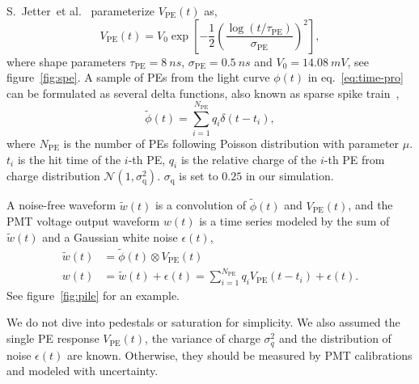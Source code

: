 S.~Jetter~et al.~\cite{jetter_pmt_2012} parameterize $V_\mathrm{PE}(t)$ as,
\begin{equation}
  V_\mathrm{PE}(t) = V_{0}\exp\left[-\frac{1}{2}\left(\frac{\log(t/\tau_\mathrm{PE})}{\sigma_\mathrm{PE}}\right)^{2}\right],
  \label{eq:dayaspe}
\end{equation}
where shape parameters $\tau_\mathrm{PE}=\SI{8}{ns}$, $\sigma_\mathrm{PE}=\SI{0.5}{ns}$ and $V_{0}=\SI{14.08}{mV}$, see figure~\ref{fig:spe}.  A sample of PEs from the light curve $\phi(t)$ in eq.~\eqref{eq:time-pro} can be formulated as several delta functions, also known as sparse spike train~\cite{levy_reconstruction_1981}, 
\begin{equation}
  \label{eq:lc-sample}
  \tilde{\phi}(t) = \sum_{i=1}^{N_{\mathrm{PE}}} q_i \delta(t-t_i),
\end{equation}
where $N_\mathrm{PE}$ is the number of PEs following Poisson distribution with parameter $\mu$.  $t_i$ is the hit time of the $i$-th PE, $q_i$ is the relative charge of the $i$-th PE from charge distribution $\mathcal{N}(1,\sigma_\mathrm{q}^2)$.  $\sigma_\mathrm{q}$ is set to $0.25$ in our simulation.

A noise-free waveform $\tilde{w}(t)$ is a convolution of $\tilde{\phi}(t)$ and $V_\mathrm{PE}(t)$, and the PMT voltage output waveform $w(t)$ is a time series modeled by the sum of $\tilde{w}(t)$ and a Gaussian white noise $\epsilon(t)$,
\begin{equation}
  \label{eq:1}
  \begin{aligned}
    \tilde{w}(t) &= \tilde{\phi}(t) \otimes V_\mathrm{PE}(t) \\
    w(t) &= \tilde{w}(t) + \epsilon(t) = \sum_{i=1}^{N_\mathrm{PE}} q_i V_\mathrm{PE}(t-t_i) + \epsilon(t).
  \end{aligned}
\end{equation}
See figure~\ref{fig:pile} for an example.

We do not dive into pedestals or saturation for simplicity.  We also assumed the single PE response $V_\mathrm{PE}(t)$, the variance of charge $\sigma_q^2$ and the distribution of noise $\epsilon(t)$ are known.  Otherwise, they should be measured by PMT calibrations and modeled with uncertainty.


